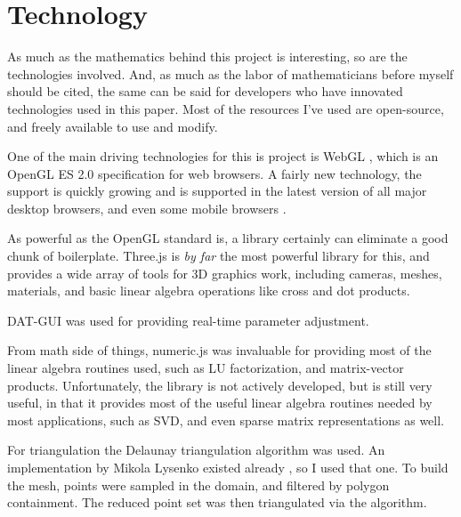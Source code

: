 \section{Technology}

As much as the mathematics behind this project is interesting, so are the technologies involved. And, as much as the
labor of mathematicians before myself should be cited, the same can be said for developers who have innovated
technologies used in this paper. Most of the resources I've used are open-source, and freely available to use and
modify.

One of the main driving technologies for this is project is WebGL \cite{webgl}, which is an OpenGL ES 2.0 specification
for web browsers. A fairly new technology, the support is quickly growing and is supported in the latest version of
all major desktop browsers, and even some mobile browsers \cite{caniuse_webgl}.

As powerful as the OpenGL standard is, a library certainly can eliminate a good chunk of boilerplate. Three.js
\cite{threejs} is \emph{by far} the most powerful library for this, and provides a wide array of tools for 3D
graphics work, including cameras, meshes, materials, and basic linear algebra operations like cross and dot products.

DAT-GUI \cite{datgui} was used for providing real-time parameter adjustment.

From math side of things, numeric.js \cite{numericjs} was invaluable for providing most of the linear algebra routines
used, such as LU factorization, and matrix-vector products. Unfortunately, the library is not actively developed, but is
still very useful, in that it provides most of the useful linear algebra routines needed by most applications, such as
SVD, and even sparse matrix representations as well.

For triangulation the Delaunay triangulation algorithm \cite{triangulation} was used. An implementation by Mikola
Lysenko existed already \cite{delaunay}, so I used that one. To build the mesh, points were sampled in the domain,
and filtered by polygon containment. The reduced point set was then triangulated via the algorithm.
